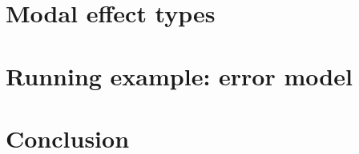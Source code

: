 \documentclass[conference]{IEEEtran}
\begin{document}
    \section{Modal effect types}



    \section{Running example: error model}



    \section{Conclusion}



%

\end{document}
